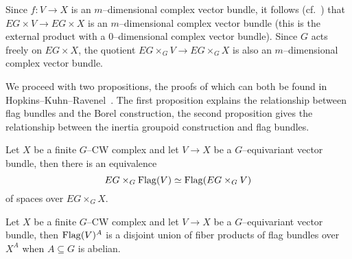 Since $f \colon V \rightarrow X$ is an $m$--dimensional complex vector bundle, it follows (cf.\ ) that $EG \times V \rightarrow EG \times X$ is an $m$--dimensional complex vector bundle (this is the external product with a $0$--dimensional complex vector bundle). Since $G$ acts freely on $EG \times X$, the quotient $EG \times_G V \rightarrow EG \times_G X$ is also an $m$--dimensional complex vector bundle.

We proceed with two propositions, the proofs of which can both be found in Hopkins--Kuhn--Ravenel~\cite[Proposition 2.6]{HKR}. The first proposition explains the relationship between flag bundles and the Borel construction, the second proposition gives the relationship between the inertia groupoid construction and flag bundles.

\begin{proposition} \label{app:orbitflags}
Let $X$ be a finite $G$--CW complex and let $V \rightarrow X$ be a $G$--equivariant vector bundle, then there is an equivalence
\[
EG \times_G \operatorname{Flag}(V) \simeq \operatorname{Flag}(EG \times_G V)
\]
of spaces over $EG \times_G X$.
\end{proposition}

\begin{proposition} \label{app:inertiaflags}
Let $X$ be a finite $G$--CW complex and let $V \rightarrow X$ be a $G$--equivariant vector bundle, then $\operatorname{Flag}(V)^A$ is a disjoint union of fiber products of flag bundles over $X^A$ when $A \subseteq G$ is abelian.
\end{proposition}

